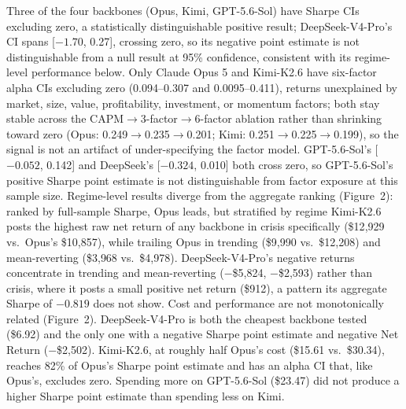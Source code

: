 \documentclass{article}
\begin{document}
Three of the four backbones (Opus, Kimi, GPT-5.6-Sol) have Sharpe CIs excluding zero, a statistically distinguishable positive result; DeepSeek-V4-Pro's CI spans [$-1.70$, 0.27], crossing zero, so its negative point estimate is not distinguishable from a null result at 95\% confidence, consistent with its regime-level performance below.
Only Claude Opus 5 and Kimi-K2.6 have six-factor alpha CIs excluding zero (0.094--0.307 and 0.0095--0.411), returns unexplained by market, size, value, profitability, investment, or momentum factors; both stay stable across the CAPM$\rightarrow$3-factor$\rightarrow$6-factor ablation rather than shrinking toward zero (Opus: 0.249$\rightarrow$0.235$\rightarrow$0.201; Kimi: 0.251$\rightarrow$0.225$\rightarrow$0.199), so the signal is not an artifact of under-specifying the factor model. GPT-5.6-Sol's [$-0.052$, 0.142] and DeepSeek's [$-0.324$, 0.010] both cross zero, so GPT-5.6-Sol's positive Sharpe point estimate is not distinguishable from factor exposure at this sample size.
Regime-level results diverge from the aggregate ranking (Figure~2): ranked by full-sample Sharpe, Opus leads, but stratified by regime Kimi-K2.6 posts the highest raw net return of any backbone in crisis specifically (\$12{,}929 vs.\ Opus's \$10{,}857), while trailing Opus in trending (\$9{,}990 vs.\ \$12{,}208) and mean-reverting (\$3{,}968 vs.\ \$4{,}978). DeepSeek-V4-Pro's negative returns concentrate in trending and mean-reverting ($-$\$5{,}824, $-$\$2{,}593) rather than crisis, where it posts a small positive net return (\$912), a pattern its aggregate Sharpe of $-0.819$ does not show.
Cost and performance are not monotonically related (Figure~2). DeepSeek-V4-Pro is both the cheapest backbone tested (\$6.92) and the only one with a negative Sharpe point estimate and negative Net Return ($-$\$2{,}502). Kimi-K2.6, at roughly half Opus's cost (\$15.61 vs.\ \$30.34), reaches 82\% of Opus's Sharpe point estimate and has an alpha CI that, like Opus's, excludes zero. Spending more on GPT-5.6-Sol (\$23.47) did not produce a higher Sharpe point estimate than spending less on Kimi.
\end{document}
